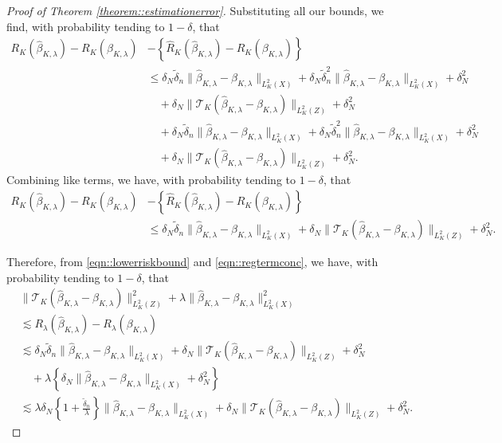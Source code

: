 \documentclass[11pt]{article}
\theoremstyle{plain}
\theoremstyle{definition}
\theoremstyle{remark}
\theoremstyle{definition}
\begin{document}
\begin{proof}[Proof of Theorem \ref{theorem::estimationerror}]
Substituting all our bounds, we find, with probability tending to $1 - \delta$, that
\begin{align*}
    R_{K}(\widehat{\beta}_{K,\lambda}) - R_{K}(\beta_{K,\lambda}) &- \left\{ \widehat{R}_{K}(\widehat{\beta}_{K,\lambda}) - \widehat{R}_{K}(\beta_{K,\lambda}) \right\} \\
   & \leq   \delta_N \widetilde{\delta}_n  \|\widehat{\beta}_{K,\lambda} - \beta_{K,\lambda}\|_{L^2_K(X)}   +   \delta_N \widetilde{\delta}_n^2  \|\widehat{\beta}_{K,\lambda} - \beta_{K,\lambda}\|_{L^2_K(X)}   + \delta_N^2 \\
    & \quad +   \delta_N   \|\mathcal{T}_{K}(\widehat{\beta}_{K,\lambda} - \beta_{K,\lambda})\|_{L^2_K(Z)} + \delta_N^2\\
   & \quad +  \delta_N \widetilde{\delta}_n \|\widehat{\beta}_{K,\lambda} - \beta_{K,\lambda}\|_{L^2_K(X)}   +   \delta_N \widetilde{\delta}_n^2  \|\widehat{\beta}_{K,\lambda} - \beta_{K,\lambda}\|_{L^2_K(X)}   + \delta_N^2 \\
    & \quad +   \delta_N   \|\mathcal{T}_{K}(\widehat{\beta}_{K,\lambda} - \beta_{K,\lambda})\|_{L^2_K(Z)} + \delta_N^2.
\end{align*}
Combining like terms, we have, with probability tending to $1 - \delta$, that
\begin{align*}
    R_{K}(\widehat{\beta}_{K,\lambda}) - R_{K}(\beta_{K,\lambda}) &- \left\{ \widehat{R}_{K}(\widehat{\beta}_{K,\lambda}) - \widehat{R}_{K}(\beta_{K,\lambda}) \right\} \\
   & \leq   \delta_N \widetilde{\delta}_n  \|\widehat{\beta}_{K,\lambda} - \beta_{K,\lambda}\|_{L^2_K(X)} +   \delta_N   \|\mathcal{T}_{K}(\widehat{\beta}_{K,\lambda} - \beta_{K,\lambda})\|_{L^2_K(Z)}    + \delta_N^2.
\end{align*}


Therefore, from \eqref{eqn::lowerriskbound} and \eqref{eqn::regtermconc}, we have, with probability tending to $1 - \delta$, that
 \begin{align*}
& \|\mathcal{T}_{K}(\widehat{\beta}_{K,\lambda}- \beta_{K,\lambda})\|_{L^2_K(Z)}^2 + \lambda \| \widehat{\beta}_{K,\lambda}- \beta_{K,\lambda}\|_{L^2_K(X)}^2\\ &\lesssim   R_{\lambda}(\widehat{\beta}_{K,\lambda}) - R_{\lambda}(\beta_{K,\lambda})\\
 &\lesssim  \delta_N \widetilde{\delta}_n  \|\widehat{\beta}_{K,\lambda} - \beta_{K,\lambda}\|_{L^2_K(X)} +   \delta_N   \|\mathcal{T}_{K}(\widehat{\beta}_{K,\lambda} - \beta_{K,\lambda})\|_{L^2_K(Z)}    + \delta_N^2 \\
 & \quad + \lambda\left\{\delta_N\|\widehat{\beta}_{K,\lambda} - \beta_{K,\lambda}\|_{L^2_K(X)} + \delta_N^2 \right\}\\
  &\lesssim   \lambda \delta_N  \left\{ 1 + \frac{\widetilde{\delta}_n}{\lambda} \right\} \|\widehat{\beta}_{K,\lambda} - \beta_{K,\lambda}\|_{L^2_K(X)} +   \delta_N   \|\mathcal{T}_{K}(\widehat{\beta}_{K,\lambda} - \beta_{K,\lambda})\|_{L^2_K(Z)}    + \delta_N^2 .
\end{align*}





\end{proof}
\end{document}
